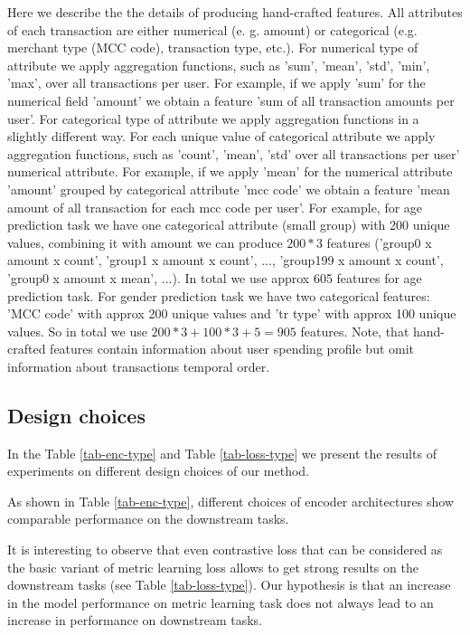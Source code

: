 \documentclass{article}
\begin{document}
Here we describe the the details of producing hand-crafted features. All attributes of each transaction are either numerical (e. g. amount) or categorical (e.g. merchant type (MCC code), transaction type, etc.). 
For numerical type of attribute we apply aggregation functions, such as 'sum', 'mean', 'std', 'min', 'max', over all transactions per user. For example, if we apply 'sum' for the numerical field 'amount' we obtain a feature 'sum of all transaction amounts per user'. 
For categorical type of attribute we apply aggregation functions in a slightly different way. For each unique value of categorical attribute we apply aggregation functions, such as 'count', 'mean', 'std' over all transactions per user' numerical attribute. For example, if we apply 'mean' for the numerical attribute 'amount' grouped by categorical attribute 'mcc code' we obtain a feature 'mean amount of all transaction for each mcc code per user'. 
For example, for age prediction task we have one categorical attribute (small group) with 200 unique values, combining it with amount we can produce $200 * 3$ features ('group0 x amount x count',  'group1 x amount x count', ..., 'group199 x amount x count', 'group0 x amount x mean', ...). In total we use approx 605 features for age prediction task. For gender prediction task we have two categorical features: 'MCC code' with approx 200 unique values and 'tr type' with approx 100 unique values. So in total we use $200 * 3 + 100 * 3 + 5 = 905$ features.
Note, that hand-crafted features contain information about user spending profile but omit information about transactions temporal order.

\subsection{Design choices}

In the Table \ref{tab-enc-type} and Table \ref{tab-loss-type} we present the results of experiments on different design choices of our method.

As shown in Table \ref{tab-enc-type}, different choices of encoder architectures show comparable performance on the downstream tasks.

It is interesting to observe that even contrastive loss that can be considered as the basic variant of metric learning loss allows to get strong results on the downstream tasks (see Table \ref{tab-loss-type}). Our hypothesis is that an increase in the model performance on metric learning task does not always lead to an increase in performance on downstream tasks.
\end{document}
